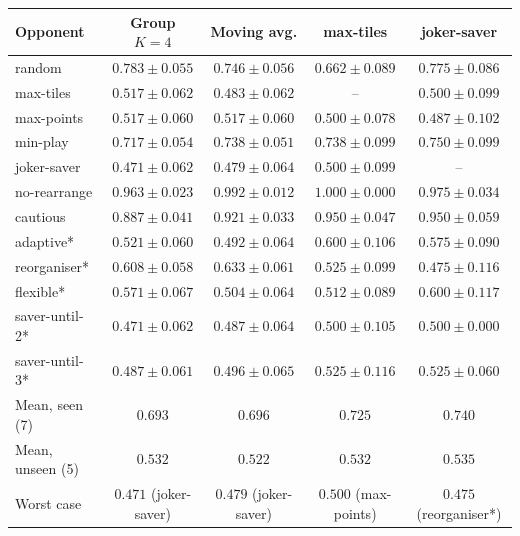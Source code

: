 \begin{tabular}{@{}lcccc@{}}\toprule
Opponent & Group $K{=}4$ & Moving avg. & max-tiles & joker-saver\\\midrule
random & $0.783\pm0.055$ & $0.746\pm0.056$ & $0.662\pm0.089$ & $0.775\pm0.086$ \\
max-tiles & $0.517\pm0.062$ & $0.483\pm0.062$ & -- & $0.500\pm0.099$ \\
max-points & $0.517\pm0.060$ & $0.517\pm0.060$ & $0.500\pm0.078$ & $0.487\pm0.102$ \\
min-play & $0.717\pm0.054$ & $0.738\pm0.051$ & $0.738\pm0.099$ & $0.750\pm0.099$ \\
joker-saver & $0.471\pm0.062$ & $0.479\pm0.064$ & $0.500\pm0.099$ & -- \\
no-rearrange & $0.963\pm0.023$ & $0.992\pm0.012$ & $1.000\pm0.000$ & $0.975\pm0.034$ \\
cautious & $0.887\pm0.041$ & $0.921\pm0.033$ & $0.950\pm0.047$ & $0.950\pm0.059$ \\
\midrule
adaptive* & $0.521\pm0.060$ & $0.492\pm0.064$ & $0.600\pm0.106$ & $0.575\pm0.090$ \\
reorganiser* & $0.608\pm0.058$ & $0.633\pm0.061$ & $0.525\pm0.099$ & $0.475\pm0.116$ \\
flexible* & $0.571\pm0.067$ & $0.504\pm0.064$ & $0.512\pm0.089$ & $0.600\pm0.117$ \\
saver-until-2* & $0.471\pm0.062$ & $0.487\pm0.064$ & $0.500\pm0.105$ & $0.500\pm0.000$ \\
saver-until-3* & $0.487\pm0.061$ & $0.496\pm0.065$ & $0.525\pm0.116$ & $0.525\pm0.060$ \\
\midrule
Mean, seen (7) & $0.693$ & $0.696$ & $0.725$ & $0.740$ \\
Mean, unseen (5) & $0.532$ & $0.522$ & $0.532$ & $0.535$ \\
Worst case & $0.471$ (joker-saver) & $0.479$ (joker-saver) & $0.500$ (max-points) & $0.475$ (reorganiser*) \\
\bottomrule\end{tabular}
